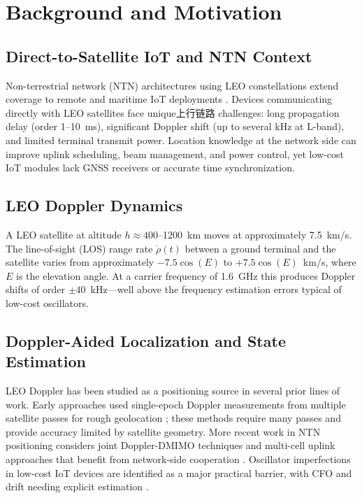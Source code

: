 \section{Background and Motivation}\label{sec:background}

\subsection{Direct-to-Satellite IoT and NTN Context}
Non-terrestrial network (NTN) architectures using LEO constellations extend
coverage to remote and maritime IoT deployments
\cite{kodheli_nb_iot_2021}.  Devices communicating directly with LEO satellites
face unique上行链路 challenges: long propagation delay (order 1--10~ms),
significant Doppler shift (up to several kHz at L-band), and limited
terminal transmit power.  Location knowledge at the network side can improve
uplink scheduling, beam management, and power control, yet low-cost IoT
modules lack GNSS receivers or accurate time synchronization.

\subsection{LEO Doppler Dynamics}
A LEO satellite at altitude $h \approx 400$--1200~km moves at approximately
7.5~km/s.  The line-of-sight (LOS) range rate $\dot{\rho}(t)$ between a
ground terminal and the satellite varies from approximately
$-7.5\cos(E)$ to $+7.5\cos(E)$~km/s, where $E$ is the elevation angle.
At a carrier frequency of 1.6~GHz this produces Doppler shifts of order
$\pm 40$~kHz---well above the frequency estimation errors typical of
low-cost oscillators.

\subsection{Doppler-Aided Localization and State Estimation}
LEO Doppler has been studied as a positioning source in several prior
lines of work.  Early approaches used single-epoch Doppler measurements
from multiple satellite passes for rough geolocation
\cite{liu_geometric_2026}; these methods require many passes and
provide accuracy limited by satellite geometry.  More recent work in NTN
positioning considers joint Doppler-DMIMO techniques and multi-cell
uplink approaches that benefit from network-side cooperation
\cite{dureppagari_leo_2024}.  Oscillator imperfections in low-cost IoT
devices are identified as a major practical barrier, with CFO and drift
needing explicit estimation \cite{ettefagh_integrated_2025}.

